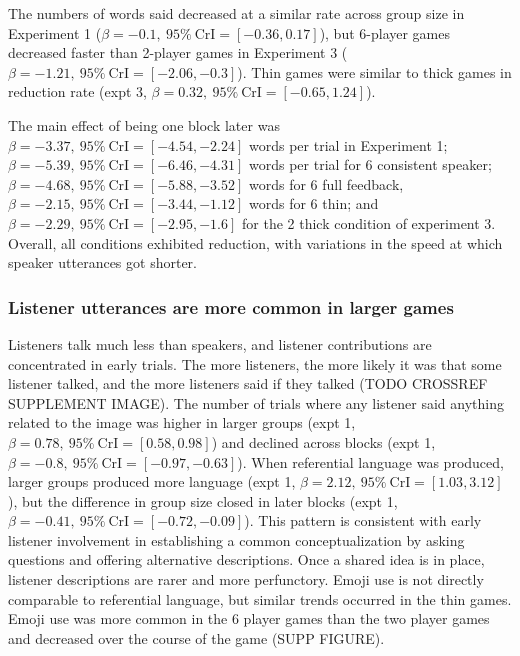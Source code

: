 \documentclass[
  english,
  a4paper,
]{article}
\begin{document}
The numbers of words said decreased at a similar rate across group size in Experiment 1 (\(\beta=-0.1,\:95\%\:\mathrm{CrI}=[-0.36, 0.17]\)), but 6-player games decreased faster than 2-player games in Experiment 3 (\(\beta=-1.21,\:95\%\:\mathrm{CrI}=[-2.06, -0.3]\)). Thin games were similar to thick games in reduction rate (expt 3, \(\beta=0.32,\:95\%\:\mathrm{CrI}=[-0.65, 1.24]\)).

The main effect of being one block later was \(\beta=-3.37,\:95\%\:\mathrm{CrI}=[-4.54, -2.24]\) words per trial in Experiment 1; \(\beta=-5.39,\:95\%\:\mathrm{CrI}=[-6.46, -4.31]\) words per trial for 6 consistent speaker; \(\beta=-4.68,\:95\%\:\mathrm{CrI}=[-5.88, -3.52]\) words for 6 full feedback, \(\beta=-2.15,\:95\%\:\mathrm{CrI}=[-3.44, -1.12]\) words for 6 thin; and \(\beta=-2.29,\:95\%\:\mathrm{CrI}=[-2.95, -1.6]\) for the 2 thick condition of experiment 3. Overall, all conditions exhibited reduction, with variations in the speed at which speaker utterances got shorter.

\hypertarget{listener-utterances-are-more-common-in-larger-games}{%
\subsubsection{Listener utterances are more common in larger games}\label{listener-utterances-are-more-common-in-larger-games}}

Listeners talk much less than speakers, and listener contributions are concentrated in early trials. The more listeners, the more likely it was that some listener talked, and the more listeners said if they talked (TODO CROSSREF SUPPLEMENT IMAGE). The number of trials where any listener said anything related to the image was higher in larger groups (expt 1, \(\beta=0.78,\:95\%\:\mathrm{CrI}=[0.58, 0.98]\)) and declined across blocks (expt 1, \(\beta=-0.8,\:95\%\:\mathrm{CrI}=[-0.97, -0.63]\)). When referential language was produced, larger groups produced more language (expt 1, \(\beta=2.12,\:95\%\:\mathrm{CrI}=[1.03, 3.12]\)), but the difference in group size closed in later blocks (expt 1, \(\beta=-0.41,\:95\%\:\mathrm{CrI}=[-0.72, -0.09]\)). This pattern is consistent with early listener involvement in establishing a common conceptualization by asking questions and offering alternative descriptions. Once a shared idea is in place, listener descriptions are rarer and more perfunctory. Emoji use is not directly comparable to referential language, but similar trends occurred in the thin games. Emoji use was more common in the 6 player games than the two player games and decreased over the course of the game (SUPP FIGURE).
\end{document}
